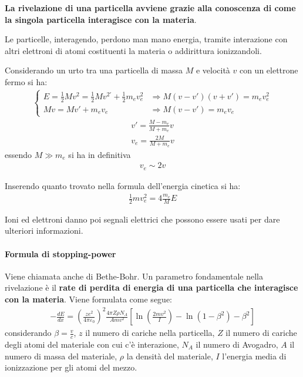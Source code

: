 \documentclass[a4paper,11pt,twoside,openany]{book}
\theoremstyle{definition}
\theoremstyle{plain}
\theoremstyle{plain}
\theoremstyle{definition}
\begin{document}
\textbf{La rivelazione di una particella avviene grazie alla conoscenza di come la singola particella interagisce con la materia}.

Le particelle, interagendo, perdono man mano energia, tramite interazione con altri elettroni di atomi costituenti la materia o addirittura ionizzandoli.

Considerando un urto tra una particella di massa $M$ e velocità $v$ con un elettrone fermo si ha:
\begin{equation}\begin{split}
\begin{cases}
E=\frac{1}{2}Mv^2=\frac{1}{2}Mv^{2'}+\frac{1}{2}m_ev_e^2 & \Longrightarrow M\left(v-v'\right)\left(v+v'\right)=m_ev_e^2\\
Mv=Mv'+m_ev_e & \Longrightarrow M\left(v-v'\right)=m_ev_e
\end{cases}
\end{split}\end{equation}
\begin{equation}\begin{split}
v'=\frac{M-m_e}{M+m_e}v\\
v_e=\frac{2M}{M+m_e}v
\end{split}\end{equation}
essendo $M\gg m_e$ si ha in definitiva
\begin{equation}\begin{split}
v_e\sim 2v
\end{split}\end{equation}

Inserendo quanto trovato nella formula dell'energia cinetica si ha:
\begin{equation}\begin{split}
\frac{1}{2}mv_e^2=4\frac{m_e}{M}E
\end{split}\end{equation}

Ioni ed elettroni danno poi segnali elettrici che possono essere usati per dare ulteriori informazioni.

\paragraph{Formula di stopping-power} Viene chiamata anche di Bethe-Bohr. Un parametro fondamentale nella rivelazione è il \textbf{rate di perdita di energia di una particella che interagisce con la materia}. Viene formulata come segue:
\begin{equation}\begin{split}
-\frac{dE}{dx}=\left(\frac{ze^2}{4\pi\varepsilon_0}\right)^2\frac{4\pi Z\rho N_A}{Amv^2}\left[\ln{\left(\frac{2mv^2}{I}\right)}-\ln{\left(1-\beta^2\right)}-\beta^2\right]
\end{split}\end{equation}
considerando $\beta=\frac{v}{c}$, $z$ il numero di cariche nella particella, $Z$ il numero di cariche degli atomi del materiale con cui c'è interazione, $N_A$ il numero di Avogadro, $A$ il numero di massa del materiale, $\rho$ la densità del materiale, $I$ l'energia media di ionizzazione per gli atomi del mezzo.
\end{document}
